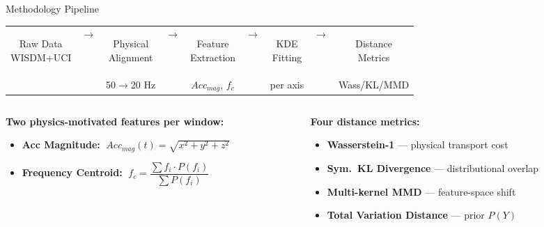 \documentclass[aspectratio=169, 10pt]{beamer}
\begin{document}
\begin{frame}{Methodology Pipeline}
  \vspace{-1mm}
  \begin{center}
  \small
  \begin{tabular}{ccccccccc}
    \colorbox{blue!10}{\parbox{1.7cm}{\centering\scriptsize Raw Data\\WISDM+UCI}} &
    \textbf{$\to$} &
    \colorbox{blue!10}{\parbox{1.7cm}{\centering\scriptsize Physical\\Alignment}} &
    \textbf{$\to$} &
    \colorbox{blue!10}{\parbox{1.7cm}{\centering\scriptsize Feature\\Extraction}} &
    \textbf{$\to$} &
    \colorbox{blue!10}{\parbox{1.7cm}{\centering\scriptsize KDE\\Fitting}} &
    \textbf{$\to$} &
    \colorbox{blue!10}{\parbox{1.7cm}{\centering\scriptsize Distance\\Metrics}} \\[3pt]
    & &
    \textcolor{noteGray}{\scriptsize 50$\to$20 Hz} & &
    \textcolor{noteGray}{\scriptsize $Acc_{mag}$, $f_c$} & &
    \textcolor{noteGray}{\scriptsize per axis} & &
    \textcolor{noteGray}{\scriptsize Wass/KL/MMD} \\
  \end{tabular}
  \end{center}

  \vspace{3mm}
  \begin{columns}[T]
    \begin{column}{0.50\textwidth}
      \textbf{Two physics-motivated features per window:}
      \vspace{1mm}
      \begin{itemize}
        \item \textbf{Acc Magnitude:}
          $\;Acc_{mag}(t) = \sqrt{x^2 + y^2 + z^2}$
        \item \textbf{Frequency Centroid:}
          $\;f_c = \dfrac{\sum f_i \cdot P(f_i)}{\sum P(f_i)}$
      \end{itemize}
    \end{column}
    \begin{column}{0.46\textwidth}
      \textbf{Four distance metrics:}
      \vspace{1mm}
      \begin{itemize}
        \item \textbf{Wasserstein-1} — physical transport cost
        \item \textbf{Sym.\ KL Divergence} — distributional overlap
        \item \textbf{Multi-kernel MMD} — feature-space shift
        \item \textbf{Total Variation Distance} — prior $P(Y)$
      \end{itemize}
    \end{column}
  \end{columns}
\end{frame}
\end{document}

